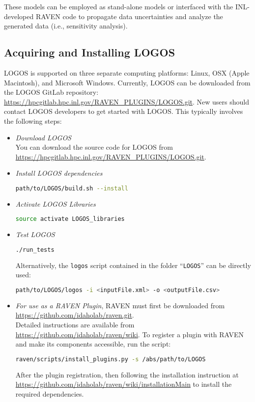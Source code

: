 These models can be employed as stand-alone models or interfaced with the INL-developed RAVEN code
to propagate data uncertainties and analyze the generated data (i.e., sensitivity analysis).

\subsection{Acquiring and Installing LOGOS}
LOGOS is supported on three separate computing platforms: Linux, OSX (Apple Macintosh), and Microsoft
Windows.
 Currently, LOGOS can be downloaded from the LOGOS GitLab repository:
\url{https://hpcgitlab.hpc.inl.gov/RAVEN_PLUGINS/LOGOS.git}. 
New users should contact LOGOS developers to get started with LOGOS. 
This typically involves the following steps:

\begin{itemize}
  \item \textit{Download LOGOS}
    \\ You can download the source code for LOGOS from \url{https://hpcgitlab.hpc.inl.gov/RAVEN_PLUGINS/LOGOS.git}.
  \item \textit{Install LOGOS dependencies}
	\begin{lstlisting}[language=bash]
	path/to/LOGOS/build.sh --install
	\end{lstlisting}
  \item \textit{Activate LOGOS Libraries}
  \begin{lstlisting}[language=bash]
  source activate LOGOS_libraries
  \end{lstlisting}
  \item \textit{Test LOGOS}
	\begin{lstlisting}[language=bash]
	./run_tests
	\end{lstlisting}
  	Alternatively, the \texttt{logos} script
    contained in the folder ``\texttt{LOGOS}'' can be directly used:
\begin{lstlisting}[language=bash]
path/to/LOGOS/logos -i <inputFile.xml> -o <outputFile.csv>
\end{lstlisting}
	\item \textit{For use as a RAVEN Plugin}, RAVEN must first be downloaded from
  \url{https://github.com/idaholab/raven.git}.
		\\ Detailed instructions are available from \url{https://github.com/idaholab/raven/wiki}.
    To register a plugin with RAVEN and make its components accessible, run the script:
    \begin{lstlisting}[language=bash]
  	raven/scripts/install_plugins.py -s /abs/path/to/LOGOS
  	\end{lstlisting}
    After the plugin registration, then following the installation instruction at
    \url{https://github.com/idaholab/raven/wiki/installationMain} to install the
    required dependencies.
\end{itemize}

